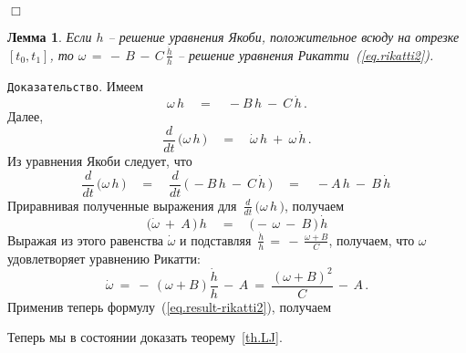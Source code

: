 \documentclass[12pt,a4paper]{article}
\newtheorem{lemma}{Лемма}
\begin{document}
{\hfill $\Box$}
\smallskip

\begin{lemma}\label{l.rikatti-positive}
Если $h$ -- решение уравнения Якоби, положительное всюду на
отрезке $[t_0, t_1]$, то $\omega \, = \, - \, B\, - \, C\,
\frac{\dot h}{h}$ -- решение уравнения
Рикатти~(\ref{eq.rikatti2}).
\end{lemma}
{\tt Доказательство}. Имеем
$$
\omega \, h \quad  = \quad  - B\, h \ - \ C\, \dot h\, .
$$
Далее,
$$
\frac{d}{dt}\, \bigl( \omega \, h\, \bigr)\quad  = \quad \dot
\omega\, h \ + \  \omega\, \dot h\, .
$$
Из уравнения  Якоби следует, что
$$
\frac{d}{dt}\, \bigl( \omega \, h\, \bigr)\quad  = \quad
\frac{d}{dt}\, \bigl( \, - B\, h \ - \ C \, \dot h\, \bigr)\quad =
\quad - A\, h \ - \ B \, \dot h\,
$$
Приравнивая полученные выражения для $\, \frac{d}{dt}\, \bigl(
\omega \, h\, \bigr)$, получаем
$$
\bigl( \dot \omega \ + \ A\,  \bigr)\, h \quad = \quad \bigl( -\,
\omega \ - \ B\, \bigr)\, \dot h
$$
Выражая из этого равенства $\dot \omega$ и подставляя $\,
\frac{\dot h}{h}\, = \, - \, \frac{\omega + B}{C}$, получаем, что
$\omega$ удовлетворяет уравнению Рикатти:
$$
\dot \omega \ = \ - \, (\omega + B)\frac{\dot h}{h} \, - \, A \ = \ \frac{(\omega + B)^2}{C}\, - \, A\, .
$$
  Применив теперь
формулу~(\ref{eq.result-rikatti2}), получаем
\smallskip

Теперь мы в состоянии доказать теорему~\ref{th.LJ}.
\smallskip
\end{document}
